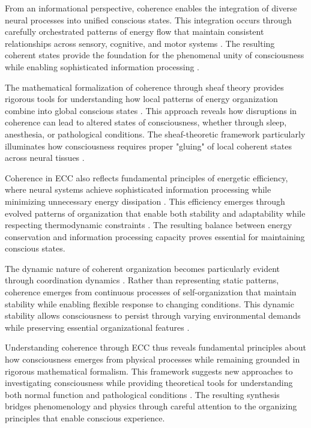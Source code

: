 \begin{refsection}
From an informational perspective, coherence enables the integration of diverse neural processes into unified conscious states. This integration occurs through carefully orchestrated patterns of energy flow that maintain consistent relationships across sensory, cognitive, and motor systems \cite{Baars2007}. The resulting coherent states provide the foundation for the phenomenal unity of consciousness while enabling sophisticated information processing \cite{Tononi2015}.

The mathematical formalization of coherence through sheaf theory provides rigorous tools for understanding how local patterns of energy organization combine into global conscious states \cite{Rushworth2018}. This approach reveals how disruptions in coherence can lead to altered states of consciousness, whether through sleep, anesthesia, or pathological conditions. The sheaf-theoretic framework particularly illuminates how consciousness requires proper "gluing" of local coherent states across neural tissues \cite{Abramsky2008}.

Coherence in ECC also reflects fundamental principles of energetic efficiency, where neural systems achieve sophisticated information processing while minimizing unnecessary energy dissipation \cite{Dehaene2011}. This efficiency emerges through evolved patterns of organization that enable both stability and adaptability while respecting thermodynamic constraints \cite{Bressler2016}. The resulting balance between energy conservation and information processing capacity proves essential for maintaining conscious states.

The dynamic nature of coherent organization becomes particularly evident through coordination dynamics \cite{Kelso2012}. Rather than representing static patterns, coherence emerges from continuous processes of self-organization that maintain stability while enabling flexible response to changing conditions. This dynamic stability allows consciousness to persist through varying environmental demands while preserving essential organizational features \cite{Haken2012}.

Understanding coherence through ECC thus reveals fundamental principles about how consciousness emerges from physical processes while remaining grounded in rigorous mathematical formalism. This framework suggests new approaches to investigating consciousness while providing theoretical tools for understanding both normal function and pathological conditions \cite{Alexander2019}. The resulting synthesis bridges phenomenology and physics through careful attention to the organizing principles that enable conscious experience.


\end{refsection}
